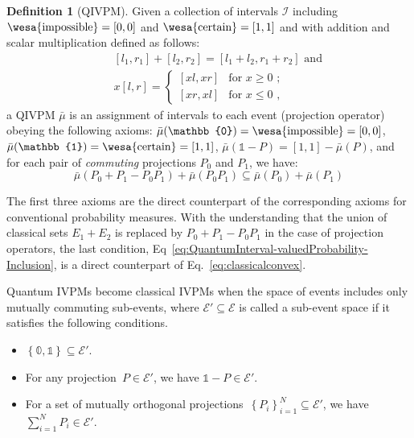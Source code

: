\documentclass[english,reprint, aps, prl,superscriptaddress, showpacs,
showkeys, longbibliography, amsmath, amssymb]{revtex4-1}
\theoremstyle{plain}
\theoremstyle{definition}
\newtheorem{definition}[thm]{Definition}
\newcommand{\events}{\ensuremath{\mathcal{E}}}
\newcommand{\imposs}{{\text{\wesa{impossible}}}}
\newcommand{\necess}{{\text{\wesa{certain}}}}
\begin{document}
\begin{definition}[QIVPM]
  Given a collection of intervals $\mathscr{I}$ including
  $\imposs=[0,0]$ and $\necess=[1,1]$ and with addition and scalar
  multiplication defined as follows:
  \begin{subequations}\label{eq:interval-operations}
  \begin{eqnarray}
   &  & [l_{1},r_{1}]+[l_{2},r_{2}]=[l_{1}+l_{2},r_{1}+r_{2}]\textrm{ and}\\
   &  & x[l,r]=\begin{cases}
  [xl,xr] & \textrm{for }x\ge0\textrm{ ;}\\{}
  [xr,xl] & \textrm{for }x\le0\textrm{ ,}
  \end{cases}
  \end{eqnarray}
  \end{subequations}
  a QIVPM $\bar{\mu}$ is an assignment of intervals to each event
  (projection operator) obeying the following axioms:
  $\bar{\mu}(\mathbb{0})=\imposs=\left[0,0\right]$,
  $\bar{\mu}(\mathbb{1})=\necess=\left[1,1\right]$,
  $\bar{\mu}\left(\mathbb{1}-P\right)=\left[1,1\right]-\bar{\mu}\left(P\right)$,
  and for each pair of \emph{commuting} projections $P_0$ and $P_1$,
  we have:
\begin{equation}
\bar{\mu}\left(P_{0}+P_{1}-P_{0}P_{1}\right)+\bar{\mu}\left(P_{0}P_{1}\right)\subseteq\bar{\mu}\left(P_{0}\right)+\bar{\mu}\left(P_{1}\right)
\label{eq:QuantumInterval-valuedProbability-Inclusion}
\end{equation}
\end{definition}
The first three axioms are the direct counterpart of the corresponding
axioms for conventional probability measures. With the understanding
that the union of classical sets $E_1+E_2$ is replaced by
$P_0+P_1-P_0P_1$ in the case of projection operators, the last
condition, Eq~\ref{eq:QuantumInterval-valuedProbability-Inclusion},
is a direct counterpart of Eq.~\ref{eq:classicalconvex}.

Quantum IVPMs become classical IVPMs when the space of events includes
only mutually commuting sub-events, where $\events'\subseteq\events$
is called a sub-event space if it satisfies the following conditions.
\begin{itemize}
\item $\left\{ \mathbb{0},\mathbb{1}\right\} \subseteq\events'$.
\item For any projection~$P\in\events'$, we have $\mathbb{1}-P\in\events'$. 
\item For a set of mutually orthogonal projections~$\left\{ P_{i}\right\} _{i=1}^{N}\subseteq\events'$,
we have $\sum_{i=1}^{N}P_{i}\in\events'$. 
\end{itemize}
\end{document}
